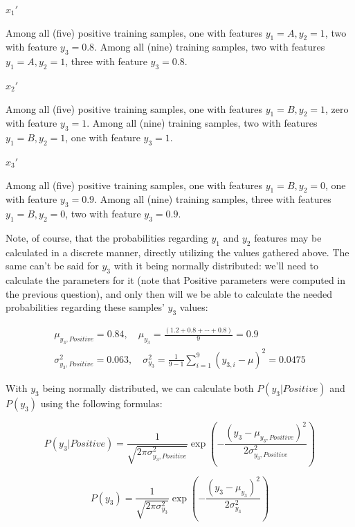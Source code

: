 \documentclass[12pt]{article}
\begin{document}
\begin{enumerate}[leftmargin=\labelsep]
\begin{multicols}{3}
    $x_1'$

    Among all (five) positive training samples, one with features $y_1 = A, y_2 = 1$,
    two with feature $y_3 = 0.8$.
    Among all (nine) training samples, two with features $y_1 = A, y_2 = 1$, three
    with feature $y_3 = 0.8$.

    \columnbreak

    $x_2'$

    Among all (five) positive training samples, one with features $y_1 = B, y_2 = 1$,
    zero with feature $y_3 = 1$.
    Among all (nine) training samples, two with features $y_1 = B, y_2 = 1$, one
    with feature $y_3 = 1$.

    \columnbreak

    $x_3'$

    Among all (five) positive training samples, one with features $y_1 = B, y_2 = 0$,
    one with feature $y_3 = 0.9$.
    Among all (nine) training samples, three with features $y_1 = B, y_2 = 0$,
    two with feature $y_3 = 0.9$.

  \end{multicols}

  Note, of course, that the probabilities regarding $y_1$ and $y_2$ features may
  be calculated in a discrete manner, directly utilizing the values gathered above.
  The same can't be said for $y_3$ with it being normally distributed:
  we'll need to calculate the parameters for it (note that Positive parameters were computed in the
  previous question), and only then will we be able to calculate the needed probabilities regarding
  these samples' $y_3$ values:

  \begin{align}
    \mu_{y_3, Positive} = 0.84, \quad \mu_{y_3} = \frac{(1.2 + 0.8 + \cdots + 0.8)}{9} = 0.9 \\
    \sigma_{y_3, Positive}^2 = 0.063, \quad \sigma_{y_3}^2 = \frac{1}{9 - 1} \sum_{i=1}^{9} (y_{3, i} - \mu)^2 = 0.0475
  \end{align}

  With $y_3$ being normally distributed, we can calculate both $P(y_3| Positive)$ and $P(y_3)$
  using the following formulas:

  $$
  P(y_3| Positive) = \frac{1}{\sqrt{2 \pi \sigma_{y_3, Positive}^2}} \exp \left( - \frac{(y_3 - \mu_{y_3, Positive})^2}{2 \sigma_{y_3, Positive}^2} \right)
  $$

  $$
  P(y_3) = \frac{1}{\sqrt{2 \pi \sigma_{y_3}^2}} \exp \left( - \frac{(y_3 - \mu_{y_3})^2}{2 \sigma_{y_3}^2} \right)
  $$


\end{enumerate}
\end{document}
